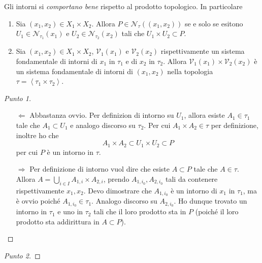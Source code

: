 \begin{theorem}
	Gli intorni si \emph{comportano bene} rispetto al prodotto topologico. In particolare
	\begin{enumerate}
		\item Sia $(x_1, x_2) \in X_1\times X_2$. Allora $P \in \mathcal{N}_\tau((x_1,x_2))$ se e solo se esitono $U_1 \in \mathcal{N}_{\tau_1}(x_1)$ e $U_2 \in \mathcal{N}_{\tau_2}(x_2)$ tali che $U_1\times U_2 \subset P$.
		\item Sia $(x_1, x_2) \in X_1\times X_2$, $\mathcal{V}_1(x_1)$ e $\mathcal{V}_2(x_2)$ rispettivamente un sistema fondamentale di intorni di $x_1$ in $\tau_1$ e di $x_2$ in $\tau_2$. Allora $\mathcal{V}_1(x_1) \times \mathcal{V}_2(x_2)$ è un sistema fondamentale di intorni di $(x_1, x_2)$ nella topologia $\tau = \left\langle \tau_1 \times \tau_2 \right\rangle$.
	\end{enumerate}	
\end{theorem}
\begin{proof}[Punto 1]
	\begin{enumerate}
		\item[$\Leftarrow$] Abbastanza ovvio. Per definizion di intorno su $U_1$, allora esiste $A_1 \in \tau_1$ tale che $A_1 \subset U_1$ e analogo discorso su $\tau_2$. Per cui $A_1 \times A_2 \in \tau$ per definizione, inoltre ho che 
		\begin{equation*}
			A_1 \times A_2 \subset U_1 \times U_2 \subset P
		\end{equation*}
		per cui $P$ è un intorno in $\tau$.
		\item[$\Rightarrow$] Per definizione di intorno vuol dire che esiste $A \subset P$ tale che $A \in \tau$. Allora $A = \bigcup_{i \in I} A_{1,i} \times A_{2,i}$, prendo $A_{1,i_0}, A_{2,i_0}$ tali da contenere rispettivamente $x_1, x_2$. Devo dimostrare che $A_{1,i_0}$ è un intorno di $x_1$ in $\tau_1$, ma è ovvio poiché $A_{1,i_0} \in \tau_1$. Analogo discorso su $A_{2,i_0}$. Ho dunque trovato un intorno in $\tau_1$ e uno in $\tau_2$ tali che il loro prodotto sta in $P$ (poiché il loro prodotto sta addirittura in $A \subset P$).
	\end{enumerate}
\end{proof}
\begin{proof}[Punto 2]
\end{proof}

